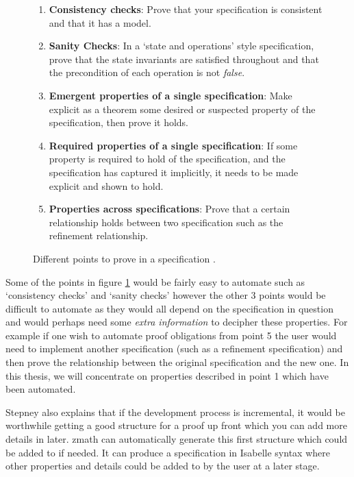 \begin{figure}[H]
\begin{enumerate}
\item \textbf{Consistency checks}: Prove that your specification is consistent and that it has a model.

\item \textbf{Sanity Checks}: In a `state and operations' style specification, prove that the state invariants are satisfied throughout and that the precondition of each operation is not \emph{false}.

\item \textbf{Emergent properties of a single specification}: Make explicit as a theorem some desired or suspected property of the specification, then prove it holds.

\item \textbf{Required properties of a single specification}: If some property is required to hold of the specification, and the specification has captured it implicitly, it needs to be made explicit and shown to hold.

\item \textbf{Properties across specifications}: Prove that a certain relationship holds between two specification such as the refinement relationship.
\end{enumerate}
\caption{Different points to prove in a specification \cite{stepney1998tale}. \label{fig:ptp}}
\end{figure}

Some of the points in figure \ref{fig:ptp} would be fairly easy to automate such as `consistency checks' and `sanity checks' however the other 3 points would be difficult to automate as they would all depend on the specification in question and would perhaps need some \emph{extra information} to decipher these properties. For example if one wish to automate proof obligations from point 5 the user would need to implement another specification (such as a refinement specification) and then prove the relationship between the original specification and the new one. In this thesis, we will concentrate on properties described in point 1 which have been automated. 

Stepney also explains that if the development process is incremental, it would be worthwhile getting a good structure for a proof up front which you can add more details in later. \gls{zmath}  can automatically generate this first structure which could be added to if needed. It can produce a specification in Isabelle syntax where other properties and details could be added to by the user at a later stage.


